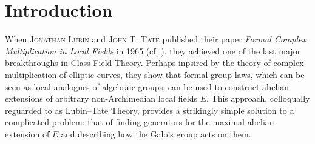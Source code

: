 \documentclass[../main.tex]{subfiles}
\begin{document}
\section*{Introduction} %

When \textsc{Jonathan Lubin} and \textsc{John T. Tate} published their
paper \textit{Formal Complex Multiplication in Local Fields} in 1965 (cf.
\cite{LubinTateFormalMult}), they achieved one of the last major breakthroughs
in Class Field Theory. Perhaps inpsired by the theory of complex multiplication
of elliptic curves, they show that formal group laws, which can be seen as local
analogues of algebraic groups, can be used to construct abelian extensions of
arbitrary non-Archimedian local fields $E$. This approach, colloqually
reguarded to as Lubin--Tate Theory, provides a strikingly simple solution to a
complicated problem: that of finding generators for the maximal abelian
extension of $E$ and describing how the Galois group acts on them. 
\end{document}
